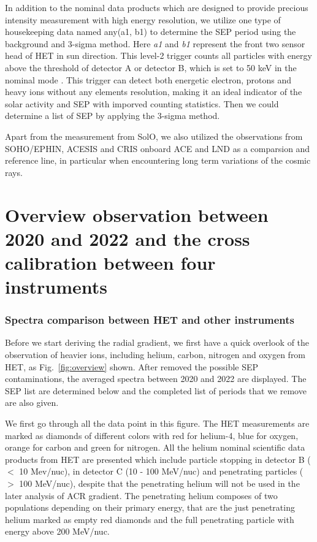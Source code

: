 In addition to the nominal data products which are designed to provide precious intensity measurement with high energy resolution, we utilize one type of housekeeping data named any(a1, b1) to determine the \ac{SEP} period using the background and 3-sigma method. Here \textit{a1} and \textit{b1} represent the front two sensor head of \ac{HET} in sun direction. This level-2 trigger counts all  particles with energy above the threshold of detector A or detector B, which is set to 50 keV in the nominal mode \citep{Elftmann-2020-PhD}. This trigger can detect both energetic electron, protons and heavy ions without any elements resolution, making it an ideal indicator of the solar activity and \ac{SEP} with imporved counting statistics. Then we could determine a list of \ac{SEP} by applying the 3-sigma method.

Apart from the measurement from \ac{SolO}, we also utilized the observations from \ac{SOHO}/\ac{EPHIN}, \ac{ACESIS} and \ac{CRIS} onboard \ac{ACE} and \ac{LND} as a comparsion and reference line, in particular when encountering long term variations of the cosmic rays.


\section{Overview observation between 2020 and 2022 and the cross calibration between four instruments}

\subsubsection*{Spectra comparison between \ac{HET} and other instruments}
Before we start deriving the radial gradient, we first have a quick overlook of the observation of heavier ions, including helium, carbon, nitrogen and oxygen from \ac{HET}, as Fig.~\ref{fig:overview} shown. After removed the possible \ac{SEP} contaminations, the averaged spectra between 2020 and 2022 are displayed. The \ac{SEP} list are determined below and the completed list of periods that we remove are also given.

We first go through all the data point in this figure.
The \ac{HET} measurements are marked as diamonds of different colors with red for helium-4, blue for oxygen, orange for carbon and green for nitrogen.
All the helium nominal scientific data products from \ac{HET} are presented which include particle stopping in detector B ($<$ 10 Mev/nuc), in detector C (10 - 100 MeV/nuc) and penetrating particles ($>$ 100 MeV/nuc), despite that the penetrating helium will not be used in the later analysis of \ac{ACR} gradient.
The penetrating helium composes of two populations depending on their primary energy, that are the just penetrating helium marked as empty red diamonds and the full penetrating particle with energy above 200 MeV/nuc. 

